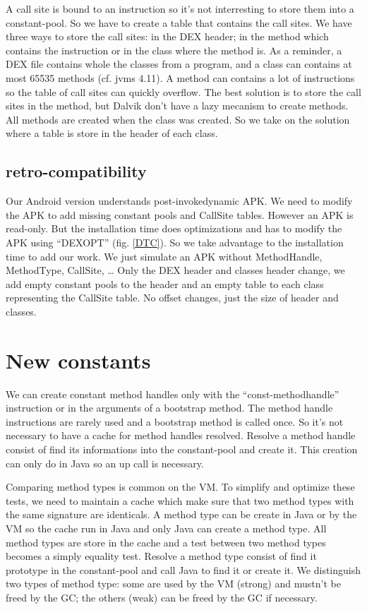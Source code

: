 \documentclass{sig-alternate}
\def \ANDROID{Android\xspace}
\begin{document}
    A call site is bound to an instruction so it's not interresting to store them into a constant-pool.
    So we have to create a table that contains the call sites.
    We have three ways to store the call sites: in the DEX header; in the method which contains the instruction or in the class where the method is.
    As a reminder, a DEX file contains whole the classes from a program, and a class can contains at most 65535 methods (cf. jvms 4.11).
    A method can contains a lot of instructions so the table of call sites can quickly overflow.
    The best solution is to store the call sites in the method, but Dalvik don't have a lazy mecanism to create methods.
    All methods are created when the class was created.
    So we take on the solution where a table is store in the header of each class.

  \subsection{retro-compatibility}
    Our \ANDROID version understands post-invokedynamic APK.
    We need to modify the APK to add missing constant pools and CallSite tables.
    However an APK is read-only.
    But the installation time does optimizations and has to modify the APK using ``DEXOPT'' (fig. \ref{DTC}).
    So we take advantage to the installation time to add our work.
    We just simulate an APK without MethodHandle, MethodType, CallSite, \dots
    Only the DEX header and classes header change, we add empty constant pools to the header
    and an empty table to each class representing the CallSite table.
    No offset changes, just the size of header and classes.

\section{New constants}

  We can create constant method handles only with the ``const-methodhandle'' instruction or in the arguments of a bootstrap method.
  The method handle instructions are rarely used and a bootstrap method is called once.
  So it's not necessary to have a cache for method handles resolved.
  Resolve a method handle consist of find its informations into the constant-pool and create it.
  This creation can only do in Java so an up call is necessary.

  Comparing method types is common on the VM.
  To simplify and optimize these tests, we need to maintain a cache which make sure that two method types with the same signature are identicals.
  A method type can be create in Java or by the VM so the cache run in Java and only Java can create a method type.
  All method types are store in the cache and a test between two method types becomes a simply equality test.
  Resolve a method type consist of find it prototype in the constant-pool and call Java to find it or create it.
  We distinguish two types of method type: some are used by the VM (strong) and mustn't be freed by the GC; the others (weak) can be freed by the GC if necessary.
\end{document}
